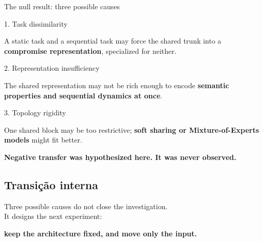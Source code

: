 \documentclass{beamer}
\begin{document}
\begin{frame}{The null result: three possible causes}

    \begin{block}{1. Task dissimilarity}
        {\footnotesize A static task and a sequential task may force the shared trunk into a \textbf{compromise representation}, specialized for neither.\par}
    \end{block}
    \begin{block}{2. Representation insufficiency}
        {\footnotesize The shared representation may not be rich enough to encode \textbf{semantic properties and sequential dynamics at once}.\par}
    \end{block}
    \begin{block}{3. Topology rigidity}
        {\footnotesize One shared block may be too restrictive; \textbf{soft sharing or Mixture-of-Experts models} might fit better.\par}
    \end{block}

    \vfill
    {\centering\textbf{Negative transfer was hypothesized here. It was never observed.}\par}
\end{frame}

\subsection{Transição interna}

{
\specialframe
\begin{frame}
    \vfill
    \begin{center}
        {\large Three possible causes do not close the investigation.\\[1mm]
        It designs the next experiment:}

        \bigskip
        {\Large\bfseries keep the architecture fixed, and move only the input.}
    \end{center}
\end{frame}
}
\end{document}
